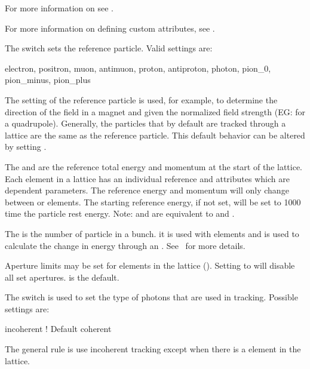 For more information on  see .

For more information on defining custom attributes, see .

The  switch sets the reference particle. Valid settings are:
\begin{example}
  electron,     positron,   
  muon,         antimuon,
  proton,       antiproton,
  photon,       pion_0,
  pion_minus,   pion_plus
\end{example}
The setting of the reference particle is used, for example, to
determine the direction of the field in a magnet and given the
normalized field strength (EG:  for a quadrupole).  Generally,
the particles that by default are tracked through a lattice are the
same as the reference particle. This default behavior can be altered
by setting .

The  and  are the reference
total energy and momentum at the start of the lattice. Each element
in a lattice has an individual reference  and  attributes
which are dependent parameters. The reference energy and momentum will only
change between  or  elements. The starting
reference energy, if not set, will be set to 1000 time the particle
rest energy.  Note:  and  are
equivalent to  and .

The  is the number of particle in a bunch.
it is used with  elements and is used to calculate the
change in energy through an . See~ for more
details.

Aperture limits may be set for elements in the lattice
(). Setting  to  will
disable all set apertures.  is the default.

The  switch is used to set the type of photons that
are used in tracking. Possible settings are:
\begin{example}
  incoherent    ! Default
  coherent 
\end{example}
The general rule is use incoherent tracking except when there is a
 element in the lattice. 

